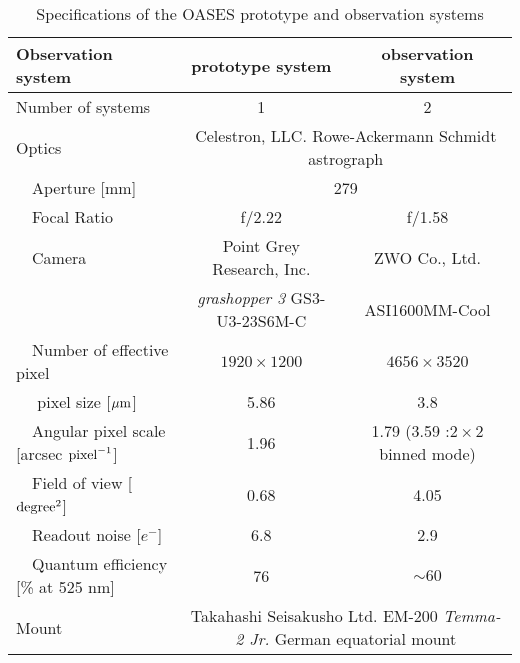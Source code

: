\documentclass{pasj01}
\newcommand{\void}[1]{}
\renewcommand{\textcolor}{\void}
\begin{document}
\begin{table}
  \caption{Specifications of the OASES prototype and observation systems}\label{tab31}
  \begin{center}
    \begin{tabular}{lcc}
      \hline 
Observation system                                                          & prototype system & observation system \\
   \hline 
 Number of systems                                                                     & 1                  & 2 \\
 Optics                                                                      & \multicolumn{2}{c}{Celestron, LLC. Rowe-Ackermann Schmidt astrograph} \\
 \ \ Aperture  [mm]                                                                  & \multicolumn{2}{c}{279}                      \\
 \ \ Focal Ratio                                                                       &  f/2.22   &    f/1.58                  \\
\ \ Camera                                                                  &   Point Grey Research, Inc. &  ZWO Co., Ltd.    \\
                                                                                &   {\it grashopper 3} GS3-U3-23S6M-C    &         ASI1600MM-Cool  \\
 \  \ Number of effective pixel                                      & $1920\times1200$        &     $4656\times3520$    \\
 \  \ \textcolor{red}{  pixel size  [${\rm \mu m}$] }         &     \textcolor{red}{5.86}       &   \textcolor{red}{3.8}  \\
 \  \  Angular pixel scale [arcsec ${\rm pixel}^{-1}$]    & 1.96                                &   1.79 (3.59 :$2\times 2$ binned mode)            \\
\  \ Field of view [${\rm degree^{2}}$]               & 0.68                               &    \textcolor{red}{4.05}     \\
\  \ Readout noise [$e^-$]                                           & 6.8                                    &     2.9   \\
\  \ Quantum efficiency [\% at 525 nm]                       & 76                                     &     $\sim 60$   \\
Mount                                                                         &  \multicolumn{2}{c}{Takahashi Seisakusho Ltd. EM-200 {\it Temma-2 Jr.} German equatorial mount} \\ 
 \hline 
    \end{tabular}
  \end{center}
\end{table}
\end{document}
